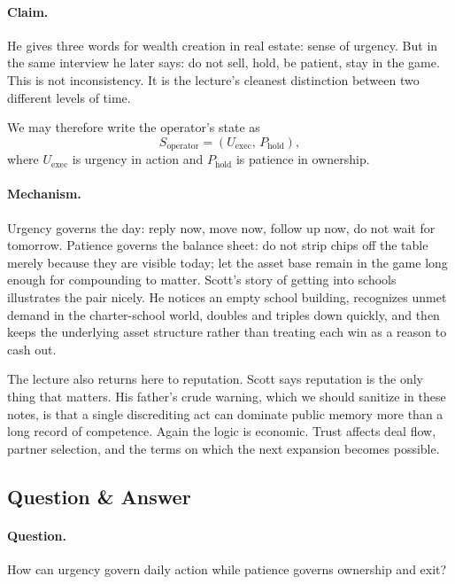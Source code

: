 \paragraph{Claim.}
He gives three words for wealth creation in real estate: sense of urgency. But in the same interview he later says: do not sell, hold, be patient, stay in the game. This is not inconsistency. It is the lecture's cleanest distinction between two different levels of time.

We may therefore write the operator's state as
\begin{equation}
S_{\mathrm{operator}} = \left(U_{\mathrm{exec}},\,P_{\mathrm{hold}}\right),
\end{equation}
where \(U_{\mathrm{exec}}\) is urgency in action and \(P_{\mathrm{hold}}\) is patience in ownership.

\paragraph{Mechanism.}
Urgency governs the day: reply now, move now, follow up now, do not wait for tomorrow. Patience governs the balance sheet: do not strip chips off the table merely because they are visible today; let the asset base remain in the game long enough for compounding to matter. Scott's story of getting into schools illustrates the pair nicely. He notices an empty school building, recognizes unmet demand in the charter-school world, doubles and triples down quickly, and then keeps the underlying asset structure rather than treating each win as a reason to cash out.

The lecture also returns here to reputation. Scott says reputation is the only thing that matters. His father's crude warning, which we should sanitize in these notes, is that a single discrediting act can dominate public memory more than a long record of competence. Again the logic is economic. Trust affects deal flow, partner selection, and the terms on which the next expansion becomes possible.

\subsection{Question \& Answer}

\paragraph{Question.}
How can urgency govern daily action while patience governs ownership and exit?

